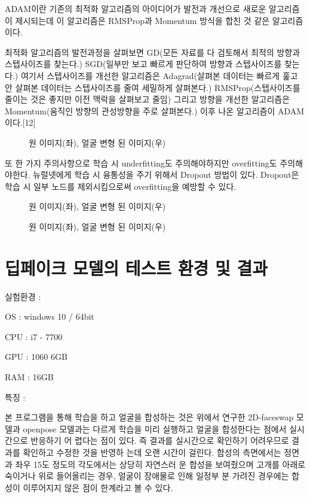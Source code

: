 \documentclass{oblivoir}
\begin{document}
ADAM이란 기존의 최적화 알고리즘의 아이디어가 발전과 개선으로 새로운 알고리즘이 제시되는데 이 알고리즘은 RMSProp과 Momentum 방식을 합친 것 같은 알고리즘이다.

최적화 알고리즘의 발전과정을 살펴보면 GD(모든 자료를 다 검토해서 최적의 방향과 스텝사이즈를 찾는다.) SGD(일부만 보고 빠르게 판단하여 방향과 스텝사이즈를 찾는다.) 여기서 스텝사이즈를 개선한 알고리즘은 Adagrad(살펴본 데이터는 빠르게 훑고 안 살펴본 데이터는 스텝사이즈를 줄여 세밀하게 살펴본다.) RMSProp(스텝사이즈를 줄이는 것은 좋지만 이전 맥락을 살펴보고 줄임) 그리고 방향을 개선한 알고리즘은 Momentum(움직인 방향의 관성방향을 주로 살펴본다.) 이후 나온 알고리즘이 ADAM이다.[12]

\begin{figure}[h!]
    \centering
\caption{원 이미지(좌), 얼굴 변형 된 이미지(우)}
\end{figure}

또 한 가지 주의사항으로 학습 시 underfitting도 주의해야하지만 overfitting도 주의해야한다. 뉴럴넷에게 학습 시 융통성을 주기 위해서 Dropout 방법이 있다. Dropout은 학습 시 일부 노드를 제외시킴으로써 overfitting을 예방할 수 있다.

\begin{figure}[h!]
    \centering
\caption{원 이미지(좌), 얼굴 변형 된 이미지(우)}
\end{figure}

\begin{figure}[h!]
    \centering
\caption{원 이미지(좌), 얼굴 변형 된 이미지(우)}
\end{figure}

\section{ 딥페이크 모델의 테스트 환경 및 결과}

실험환경 :

OS : windows 10 / 64bit

CPU : i7 - 7700

GPU : 1060 6GB

RAM : 16GB

특징 :

 본 프로그램을 통해 학습을 하고 얼굴을 합성하는 것은 위에서 연구한 2D-faceswap 모델과  openpose 모델과는 다르게 학습을 미리 실행하고 얼굴을 합성한다는 점에서 실시간으로 반응하기 어 렵다는 점이 있다. 즉 결과를 실시간으로 확인하기 어려우므로 결과를 확인하고 수정한 것을 반영하 는데 오랜 시간이 걸린다. 합성의 측면에서는 정면과 좌우 15도 정도의 각도에서는 상당히 자연스러 운 합성을 보여줬으며 고개를 아래로 숙이거나 위로 들어올리는 경우, 얼굴이 장애물로 인해 일정부 분 가려진 경우에는 합성이 이루어지지 않은 점이 한계라고 볼 수 있다.
\end{document}
